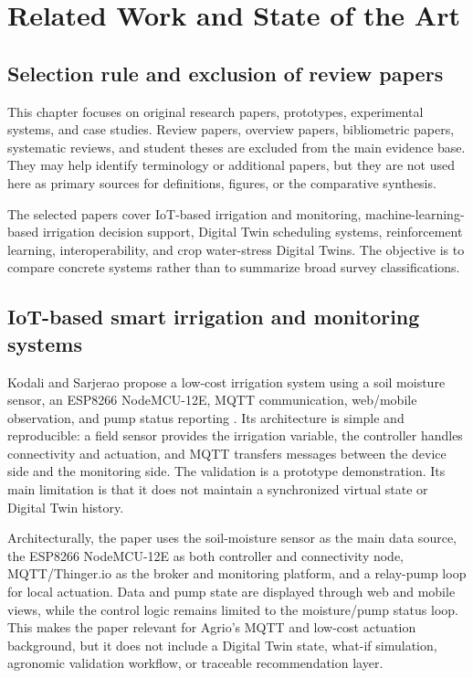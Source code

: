 \chapter{Related Work and State of the Art}
\label{chap:related_work}

\section{Selection rule and exclusion of review papers}

This chapter focuses on original research papers, prototypes, experimental systems, and case studies. Review papers, overview papers, bibliometric papers, systematic reviews, and student theses are excluded from the main evidence base. They may help identify terminology or additional papers, but they are not used here as primary sources for definitions, figures, or the comparative synthesis.

The selected papers cover IoT-based irrigation and monitoring, machine-learning-based irrigation decision support, Digital Twin scheduling systems, reinforcement learning, interoperability, and crop water-stress Digital Twins. The objective is to compare concrete systems rather than to summarize broad survey classifications.

\section{IoT-based smart irrigation and monitoring systems}

Kodali and Sarjerao propose a low-cost irrigation system using a soil moisture sensor, an ESP8266 NodeMCU-12E, MQTT communication, web/mobile observation, and pump status reporting \cite{kodali2017mqttirrigation}. Its architecture is simple and reproducible: a field sensor provides the irrigation variable, the controller handles connectivity and actuation, and MQTT transfers messages between the device side and the monitoring side. The validation is a prototype demonstration. Its main limitation is that it does not maintain a synchronized virtual state or Digital Twin history.

Architecturally, the paper uses the soil-moisture sensor as the main data source, the ESP8266 NodeMCU-12E as both controller and connectivity node, MQTT/Thinger.io as the broker and monitoring platform, and a relay-pump loop for local actuation. Data and pump state are displayed through web and mobile views, while the control logic remains limited to the moisture/pump status loop. This makes the paper relevant for Agrio's MQTT and low-cost actuation background, but it does not include a Digital Twin state, what-if simulation, agronomic validation workflow, or traceable recommendation layer.

